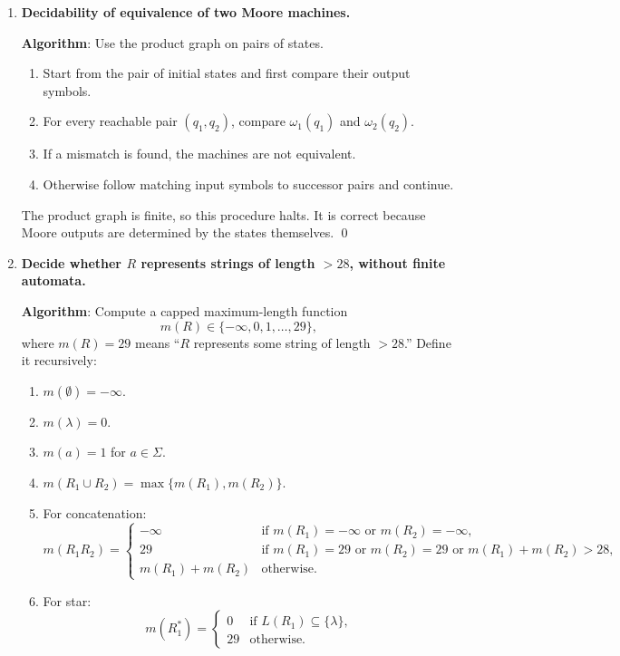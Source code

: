 \begin{enumerate}[{12.}1. ]
\item \textbf{Decidability of equivalence of two Moore machines.}

\textbf{Algorithm}: Use the product graph on pairs of states.
\begin{enumerate}
\item Start from the pair of initial states and first compare their output
symbols.
\item For every reachable pair $(q_1,q_2)$, compare $\omega_1(q_1)$ and
$\omega_2(q_2)$.
\item If a mismatch is found, the machines are not equivalent.
\item Otherwise follow matching input symbols to successor pairs and continue.
\end{enumerate}
The product graph is finite, so this procedure halts. It is correct because
Moore outputs are determined by the states themselves. \qed

\item \textbf{Decide whether $R$ represents strings of length $> 28$, without finite automata.}

\textbf{Algorithm}: Compute a capped maximum-length function
\[
m(R)\in\{-\infty,0,1,\ldots,29\},
\]
where $m(R)=29$ means ``$R$ represents some string of length $>28$.'' Define it
recursively:

\begin{enumerate}
\item $m(\emptyset)=-\infty$.
\item $m(\lambda)=0$.
\item $m(a)=1$ for $a\in\Sigma$.
\item $m(R_1\cup R_2)=\max\{m(R_1),m(R_2)\}$.
\item For concatenation:
\[
m(R_1R_2)=
\left\{
\begin{array}{ll}
-\infty & \text{if }m(R_1)=-\infty\text{ or }m(R_2)=-\infty,\\
29 & \text{if }m(R_1)=29\text{ or }m(R_2)=29\text{ or }m(R_1)+m(R_2)>28,\\
m(R_1)+m(R_2) & \text{otherwise.}
\end{array}
\right.
\]
\item For star:
\[
m(R_1^*)=
\left\{
\begin{array}{ll}
0 & \text{if }L(R_1)\subseteq\{\lambda\},\\
29 & \text{otherwise.}
\end{array}
\right.
\]
\end{enumerate}


\end{enumerate}
